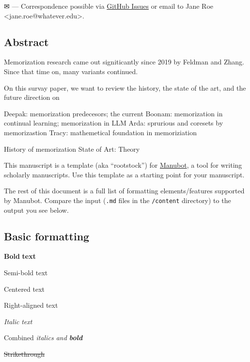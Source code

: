 \documentclass[
]{article}
\begin{document}
\leavevmode{}%
✉ --- Correspondence possible via \href{https://github.com/bnshin83/MSA/issues}{GitHub Issues}
or email to
Jane Roe \textless jane.roe@whatever.edu\textgreater.

\hypertarget{abstract}{%
\subsection{Abstract}\label{abstract}}

Memorization research came out signiticantly since 2019 by Feldman and Zhang.
Since that time on, many variants continued.

On this survay paper, we want to review the history, the state of the art, and the future direction on

Deepak: memorization predecesors; the current
Boonam: memorization in continual learning; memorization in LLM
Arda: sprurious and coresets by memorizastion
Tracy: mathemetical foundation in memoriziation

History of memorization
State of Art:
Theory

This manuscript is a template (aka ``rootstock'') for \href{https://manubot.org/}{Manubot}, a tool for writing scholarly manuscripts.
Use this template as a starting point for your manuscript.

The rest of this document is a full list of formatting elements/features supported by Manubot.
Compare the input (\texttt{.md} files in the \texttt{/content} directory) to the output you see below.

\hypertarget{basic-formatting}{%
\subsection{Basic formatting}\label{basic-formatting}}

\textbf{Bold} \textbf{text}

{Semi-bold text}

{Centered text}

{Right-aligned text}

\emph{Italic} \emph{text}

Combined \emph{italics and \textbf{bold}}

\sout{Strikethrough}
\end{document}
